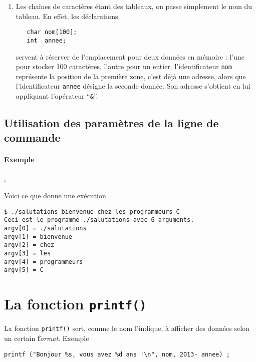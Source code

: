 \documentclass[10pt]{article}
\begin{document}
\begin{enumerate}
C'est parce qu'en C, 
\begin{quote}le passage de paramètre se fait par valeur
\end{quote}
il n'y a pas de passage de paramètres par référence. Pour transmettre
une donnée qu'une fonction doit modifier, on passe explicitement en
paramètre \emph{son adresse}.  Pour saisir quelque chose dans une variable
entière (ou réelle), on précède donc le nom de la variable par
l'opérateur \texttt{\&}.
\item 
Les chaînes de caractères étant des tableaux, on passe simplement le nom
du tableau. En effet, les déclarations
\begin{verbatim}
   char nom[100];
   int  annee;
\end{verbatim}
servent à réserver de l'emplacement pour deux données en mémoire :
l'une pour stocker 100 caractères, l'autre pour un entier.
l'identificateur \texttt{nom} représente la position de la première
zone, c'est déjà une adresse, alors que l'identificateur
\texttt{annee} désigne la seconde donnée. Son adresse s'obtient en lui
appliquant l'opérateur ``\texttt{\&}''.
\end{enumerate}


\subsection{Utilisation des paramètres de la ligne de commande}
 
 \paragraph{Exemple} :
 
 
 Voici ce que donne une exécution
\begin{verbatim}
$ ./salutations bienvenue chez les programmeurs C
Ceci est le programme ./salutations avec 6 arguments.
argv[0] = ./salutations
argv[1] = bienvenue
argv[2] = chez
argv[3] = les
argv[4] = programmeurs
argv[5] = C
\end{verbatim}

\section{La fonction \texttt{printf()}}

La fonction \texttt{printf()} sert, comme le nom l'indique, à afficher
des données selon un certain \textbf{f}\emph{ormat}.
Exemple
\begin{verbatim}
printf ("Bonjour %s, vous avez %d ans !\n", nom, 2013- annee) ;
\end{verbatim}
\end{document}

